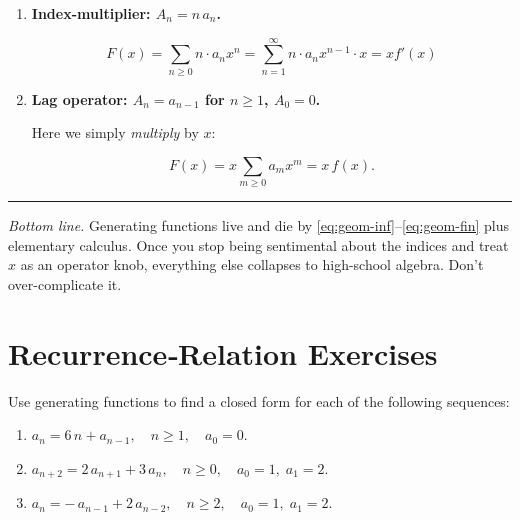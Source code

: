 \documentclass[docmute]{article}
\begin{document}
\begin{enumerate}[label=\textbf{2(\alph*)}\quad]
\[
F(x) = \sum_{n \geq 0} (a_{n+1} - a_n) x^n
\]

\textbf{Step 1: Express \(f(x)\) and subtract off \(a_0\):}

\[
f(x) = \sum_{n=0}^{\infty} a_n x^n
\]

\[
f(x) - a_0 = \sum_{n=1}^{\infty} a_n x^n
\]

Thus, we can rewrite the sum as:

\[
F(x) = \left[ f(x) - a_0 \right] \frac{1}{x} - f(x)
\]

\textbf{Step 2: Factor and simplify:}

\[
F(x) = \frac{f(x)(1 - x) - a_0}{x}
\]

\medskip\item \textbf{Index-multiplier: $A_{n}=n\,a_{n}$.}

\[
F(x) = \sum_{n \geq 0} n \cdot a_n x^n = \sum_{n=1}^{\infty} n \cdot a_n x^{n-1} \cdot x = x f'(x)
\]


\medskip\item \textbf{Lag operator: $A_{n}=a_{n-1}$ for $n\ge1$, $A_{0}=0$.}

Here we simply \emph{multiply} by $x$:

\[
   F(x)=x\sum_{m\ge0}a_{m}x^{m}=x\,f(x).
\]


\end{enumerate}

\bigskip
\hrule
\bigskip

\noindent
\emph{Bottom line.}  Generating functions live and die by
\eqref{eq:geom-inf}–\eqref{eq:geom-fin} plus elementary calculus.  Once you stop
being sentimental about the indices and treat $x$ as an operator knob,
everything else collapses to high-school algebra.  Don’t over-complicate it.


\section*{Recurrence‐Relation Exercises}

Use generating functions to find a closed form for each of the following sequences:
\begin{enumerate}[label=\textbf{(\alph*)}]
  \item $a_n = 6\,n + a_{n-1},\quad n\ge1,\quad a_0=0.$
  \item $a_{n+2} = 2\,a_{n+1} + 3\,a_n,\quad n\ge0,\quad a_0=1,\;a_1=2.$
  \item $a_n = -\,a_{n-1} + 2\,a_{n-2},\quad n\ge2,\quad a_0=1,\;a_1=2.$
\end{enumerate}
\end{document}
